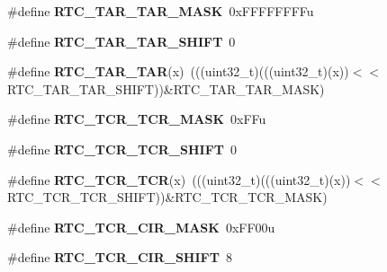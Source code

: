 \begin{DoxyCompactItemize}
\item 
\mbox{\label{group___r_t_c___register___masks_ga649a76416ad00079054bd866565dada2}} 
\#define {\bfseries R\+T\+C\+\_\+\+T\+A\+R\+\_\+\+T\+A\+R\+\_\+\+M\+A\+SK}~0x\+F\+F\+F\+F\+F\+F\+F\+Fu
\item 
\mbox{\label{group___r_t_c___register___masks_ga9ec8791d91dc36f0f59a7705988f7278}} 
\#define {\bfseries R\+T\+C\+\_\+\+T\+A\+R\+\_\+\+T\+A\+R\+\_\+\+S\+H\+I\+FT}~0
\item 
\mbox{\label{group___r_t_c___register___masks_ga02ce5bc2603bebe1356ce961142f6700}} 
\#define {\bfseries R\+T\+C\+\_\+\+T\+A\+R\+\_\+\+T\+AR}(x)~(((uint32\+\_\+t)(((uint32\+\_\+t)(x))$<$$<$R\+T\+C\+\_\+\+T\+A\+R\+\_\+\+T\+A\+R\+\_\+\+S\+H\+I\+FT))\&R\+T\+C\+\_\+\+T\+A\+R\+\_\+\+T\+A\+R\+\_\+\+M\+A\+SK)
\item 
\mbox{\label{group___r_t_c___register___masks_ga48a96d1de8db1993bfac3ca9d6bdb227}} 
\#define {\bfseries R\+T\+C\+\_\+\+T\+C\+R\+\_\+\+T\+C\+R\+\_\+\+M\+A\+SK}~0x\+F\+Fu
\item 
\mbox{\label{group___r_t_c___register___masks_ga0d8bc8c79b8010b8ebb94562428713fe}} 
\#define {\bfseries R\+T\+C\+\_\+\+T\+C\+R\+\_\+\+T\+C\+R\+\_\+\+S\+H\+I\+FT}~0
\item 
\mbox{\label{group___r_t_c___register___masks_gaca21d09697f88aef5b056c81daaa8445}} 
\#define {\bfseries R\+T\+C\+\_\+\+T\+C\+R\+\_\+\+T\+CR}(x)~(((uint32\+\_\+t)(((uint32\+\_\+t)(x))$<$$<$R\+T\+C\+\_\+\+T\+C\+R\+\_\+\+T\+C\+R\+\_\+\+S\+H\+I\+FT))\&R\+T\+C\+\_\+\+T\+C\+R\+\_\+\+T\+C\+R\+\_\+\+M\+A\+SK)
\item 
\mbox{\label{group___r_t_c___register___masks_ga8f198d1dbc7427e1dfabdc4e9f53f8e2}} 
\#define {\bfseries R\+T\+C\+\_\+\+T\+C\+R\+\_\+\+C\+I\+R\+\_\+\+M\+A\+SK}~0x\+F\+F00u
\item 
\mbox{\label{group___r_t_c___register___masks_ga4b8c9ecf8ed798b8c0173ce122874c5e}} 
\#define {\bfseries R\+T\+C\+\_\+\+T\+C\+R\+\_\+\+C\+I\+R\+\_\+\+S\+H\+I\+FT}~8

\end{DoxyCompactItemize}
